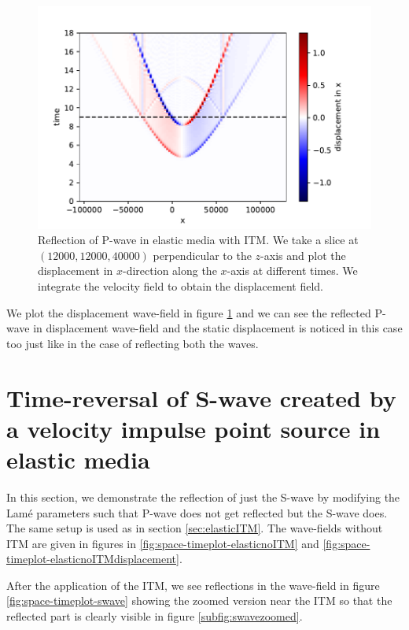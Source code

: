 \begin{figure}[htpb] %
    \centering
    \includegraphics[width=0.75\linewidth]{figures/pwave-ITMdisplacement.pdf}
    \caption{Reflection of P-wave in elastic media with \ac{ITM}. We take a slice at $\left(12000,12000,40000\right)$ perpendicular to the $z$-axis
    and plot the displacement in $x$-direction along the $x$-axis at different times. We integrate the velocity field to obtain the displacement field.}
    \label{fig:space-timeplot-pwavedisplacement}
\end{figure}

We plot the displacement wave-field in figure \ref{fig:space-timeplot-pwavedisplacement} and we can see the reflected P-wave in displacement wave-field and the static
displacement is noticed in this case too just like in the case of reflecting both the waves. 

\section{Time-reversal of S-wave created by a velocity impulse point source in elastic media} \label{sec:elasticITMswave}
In this section, we demonstrate the reflection of just the S-wave by modifying the Lam\'{e} parameters such that P-wave does not
get reflected but the S-wave does. The same setup is used as in section \ref{sec:elasticITM}. The wave-fields without \ac{ITM} are given in figures in \ref{fig:space-timeplot-elasticnoITM}
and \ref{fig:space-timeplot-elasticnoITMdisplacement}.
\par After the application of the \ac{ITM}, we see reflections in the wave-field in figure \ref{fig:space-timeplot-swave} showing the zoomed version near the 
\ac{ITM} so that the reflected part is clearly visible in figure \ref{subfig:swavezoomed}.

